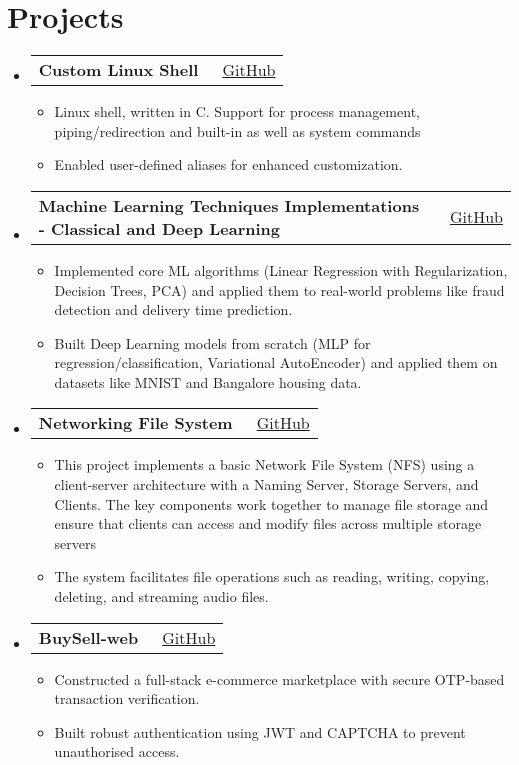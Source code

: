 \documentclass[a4paper,10pt]{article}
\makeatletter
\newcommand{\resumeItem}[1]{\item[\textcolor{bulletcolor}{\textbullet}] \small{#1}}
\newcommand{\resumeProjectHeading}[2]{
    \item
    \begin{tabular*}{0.97\textwidth}{l@{\extracolsep{\fill}}r}
        \textbf{#1} & {\small #2} \\
    \end{tabular*}\vspace{-7pt}
}
\makeatother
\begin{document}
\section{Projects}
\begin{itemize}[leftmargin=0.15in, label={}]        
    \resumeProjectHeading
        {\textbf{Custom Linux Shell}}{{\small\faGithub}\ \href{https://github.com/mayank3135432/osn-mp1}{GitHub}}
        \begin{itemize}[leftmargin=0.15in]
            \resumeItem{Linux shell, written in C. Support for process management, piping/redirection and built-in as well as system commands}
            \resumeItem{Enabled user-defined aliases for enhanced customization.}
        \end{itemize}
    
    \resumeProjectHeading
  {\textbf{Machine Learning Techniques Implementations - Classical and Deep Learning}}{{\small\faGithub}\ \href{https://github.com/mayank3135432/ML-DL-Implementations}{GitHub}}
  \begin{itemize}[leftmargin=0.15in]
    \resumeItem{Implemented core ML algorithms (Linear Regression with Regularization, Decision Trees, PCA) and applied them to real-world problems like fraud detection and delivery time prediction.}
    \resumeItem{Built Deep Learning models from scratch (MLP for regression/classification, Variational AutoEncoder) and applied them on datasets like MNIST and Bangalore housing data.}
  \end{itemize}


        
    \resumeProjectHeading
        {\textbf{Networking File System}}{{\small\faGithub}\ \href{https://github.com/mayank3135432/Networking_File_System_Dummy}{GitHub}}
        \begin{itemize}[leftmargin=0.15in]
            \resumeItem{This project implements a basic Network File System (NFS) using a client-server architecture with a Naming Server, Storage Servers, and Clients. The key components work together to manage file storage and ensure that clients can access and modify files across multiple storage servers}
            \resumeItem{The system facilitates file operations such as reading, writing, copying, deleting, and streaming audio files.}
        \end{itemize}

        

        
    \resumeProjectHeading
        {\textbf{BuySell-web}}{{\small\faGithub}\ \href{https://github.com/mayank3135432/BUYSELL-web}{GitHub}}
        \begin{itemize}[leftmargin=0.15in]
            \resumeItem{Constructed a full-stack e-commerce marketplace with secure OTP-based transaction verification.}
            \resumeItem{Built robust authentication using JWT and CAPTCHA to prevent unauthorised access.}
            
        \end{itemize}

\end{itemize}
\end{document}
